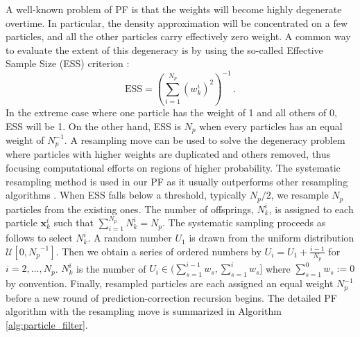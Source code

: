 A well-known problem of PF is that the weights will become highly degenerate overtime. In particular, the density approximation will be concentrated on a few particles, and all the other particles carry effectively zero weight. A common way to evaluate the extent of this degeneracy is by using the so-called Effective Sample Size (ESS) criterion \cite{liu2008monte}:
\begin{equation}
\text{ESS}=\left(\sum_{i=1}^{N_{p}}\left(w_k^{i}\right)^{2}\right)^{-1} \,.
\end{equation}
In the extreme case where one particle has the weight of 1 and all others of 0, ESS will be 1. On the other hand, ESS is $N_p$ when every particles has an equal weight of $N_p^{-1}$.
A resampling move can be used to solve the degeneracy problem where particles with higher weights are duplicated and others removed, thus focusing computational efforts on regions of higher probability. The systematic resampling method is used in our PF as it usually outperforms other resampling algorithms \cite{doucet2009tutorial}. When ESS falls below a threshold, typically $N_p/2$, we resample $N_p$ particles from the existing ones. The number of offsprings, $N_k^{i}$, is assigned to each particle $\boldsymbol{x}_k^i$ such that $\sum_{i=1}^{N_p}N_k^{i} = N_p$. The systematic sampling proceeds as follows to select $N_k^{i}$. A random number $U_{1}$ is drawn from the uniform distribution $\mathcal{U}\left[0, {N_p}^{-1}\right]$. Then we obtain a series of ordered numbers by $U_{i}=U_{1}+\frac{i-1}{N_p}$ for $i=2, \ldots, N_p$. $N_k^{i}$ is the number of $U_{i} \in(\sum_{s=1}^{i-1} w_{s}, \sum_{s=1}^{i} w_{s}]$ where $\sum_{s=1}^{0} w_{s} := 0$ by convention. Finally, resampled particles are each assigned an equal weight $N_{p}^{-1}$ before a new round of prediction-correction recursion begins. The detailed PF algorithm with the resampling move is summarized in Algorithm \ref{alg:particle_filter}.
